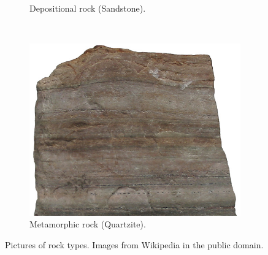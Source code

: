\documentclass[a4paper,12pt]{report}
\begin{document}
\begin{figure}[]
\begin{subfigure}[b]{0.3\textwidth}
                \caption{Depositional rock (Sandstone).}
                \label{fig:tiger}
        \end{subfigure}
        ~ %
        \begin{subfigure}[b]{0.3\textwidth}
                \centering
                \includegraphics[width=\textwidth]{thesis/geo/quartzite.jpg}
                \caption{Metamorphic rock (Quartzite).}
                \label{fig:mouse}
        \end{subfigure}
        \caption{Pictures of rock types. Images from Wikipedia in the public domain.}\label{fig:rocks}
\end{figure}
\end{document}
